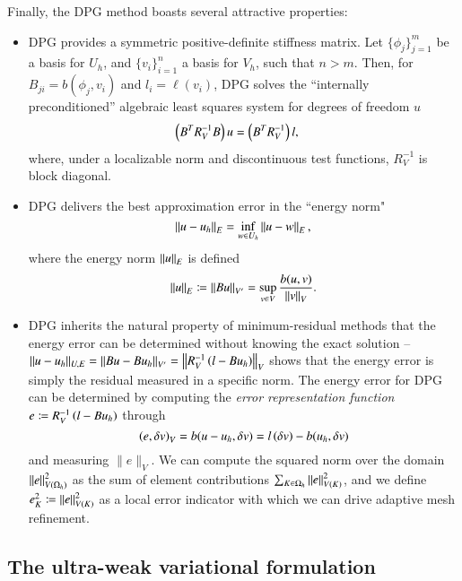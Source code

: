 Finally, the DPG method boasts several attractive properties: 
\begin{itemize}
\item DPG provides a symmetric positive-definite stiffness matrix. Let $\{\phi_j\}_{j=1}^m$ be a basis for $U_h$, and $\{v_i\}_{i=1}^n$ a basis for $V_h$, such that $n>m$. Then, for $B_{ji} = b(\phi_j,v_i)$ and $l_i = \ell(v_i)$, DPG solves the ``internally preconditioned'' algebraic least squares system for degrees of freedom $u$
\begin{align*}
\LRp{B^T R_V^{-1}B} u  &= \LRp{B^T R_V^{-1}} l,
\end{align*}
where, under a localizable norm and discontinuous test functions, $R_V^{-1}$ is block diagonal.
\item DPG delivers the best approximation error in the ``energy norm" \cite{Bui-ThanhDemkowiczGhattas11a, DPG2, DPG4} 
\begin{equation}
\eqnlab{optimalError}
\nor{u-u_h}_{E} = \inf_{w\in U_h} \nor{u-w}_{E},
\end{equation}
where the energy norm $\nor{u}_{E}$ is defined 
\begin{equation}
\eqnlab{energyNorm} \nor{u}_{E} \coloneqq \nor{Bu}_{V'} = \sup_{v\in V}\frac{b(u,v)}{\nor{v}_V}.
\end{equation}
\item DPG inherits the natural property of minimum-residual methods that the energy error can be determined without knowing the exact solution --  $\|u-u_h\|_{U,E}  = \nor{Bu - Bu_h}_{V'} = \nor{R_V^{-1}\LRp{l-Bu_h}}_{V}$ shows that the energy error is simply the residual measured in a specific norm.  The energy error for DPG can be determined by computing the \textit{error representation function} $e \coloneqq R_V^{-1}\LRp{l-Bu_h}$ through
\[
\left(e,\delta v\right)_V = b(u-u_h,\delta v) = l\LRp{\delta v} - b(u_h,\delta v)
\]
and measuring $\|e\|_V$.  %
We can compute the squared norm over the domain $\nor{e}_{V(\Oh)}^2$ as the sum of element contributions $\sum_{K\in \Oh} \nor{e}_{V(K)}^2$, and we define $e_K^2 \coloneqq \nor{e}_{V(K)}^2$ as a local error indicator with which we can drive adaptive mesh refinement.  
\end{itemize}

\subsection{The ultra-weak variational formulation}

